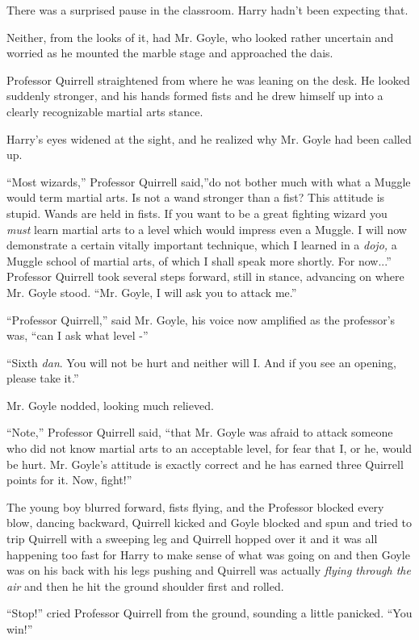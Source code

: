 There was a surprised pause in the classroom. Harry hadn't been
expecting that.

Neither, from the looks of it, had Mr. Goyle, who looked rather
uncertain and worried as he mounted the marble stage and approached the
dais.

Professor Quirrell straightened from where he was leaning on the desk.
He looked suddenly stronger, and his hands formed fists and he drew
himself up into a clearly recognizable martial arts stance.

Harry's eyes widened at the sight, and he realized why Mr. Goyle had
been called up.

``Most wizards,'' Professor Quirrell said,''do not bother much with what
a Muggle would term martial arts. Is not a wand stronger than a fist?
This attitude is stupid. Wands are held in fists. If you want to be a
great fighting wizard you \emph{must} learn martial arts to a level
which would impress even a Muggle. I will now demonstrate a certain
vitally important technique, which I learned in a \emph{dojo,} a Muggle
school of martial arts, of which I shall speak more shortly. For
now...'' Professor Quirrell took several steps forward, still in
stance, advancing on where Mr. Goyle stood. ``Mr. Goyle, I will ask you
to attack me.''

``Professor Quirrell,'' said Mr. Goyle, his voice now amplified as the
professor's was, ``can I ask what level -''

``Sixth \emph{dan}. You will not be hurt and neither will I. And if you
see an opening, please take it.''

Mr. Goyle nodded, looking much relieved.

``Note,'' Professor Quirrell said, ``that Mr. Goyle was afraid to attack
someone who did not know martial arts to an acceptable level, for fear
that I, or he, would be hurt. Mr. Goyle's attitude is exactly correct
and he has earned three Quirrell points for it. Now, fight!''

The young boy blurred forward, fists flying, and the Professor blocked
every blow, dancing backward, Quirrell kicked and Goyle blocked and spun
and tried to trip Quirrell with a sweeping leg and Quirrell hopped over
it and it was all happening too fast for Harry to make sense of what was
going on and then Goyle was on his back with his legs pushing and
Quirrell was actually \emph{flying through the air} and then he hit the
ground shoulder first and rolled.

``Stop!'' cried Professor Quirrell from the ground, sounding a little
panicked. ``You win!''

